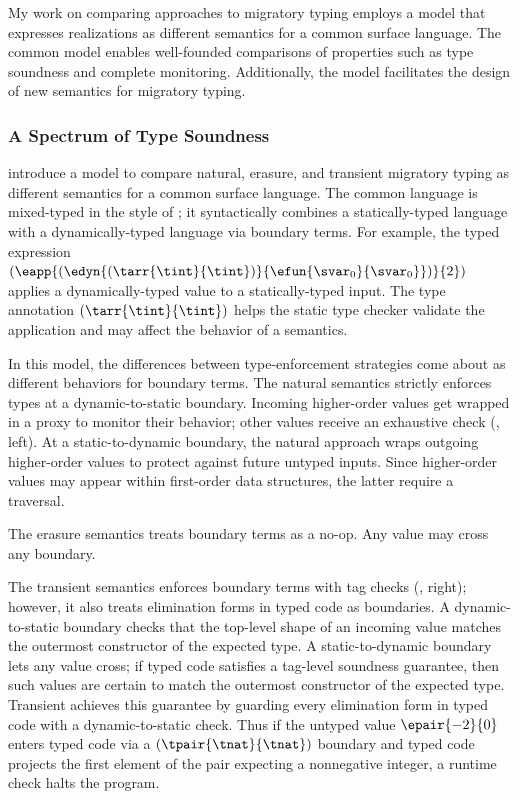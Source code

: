My work on comparing approaches to migratory typing employs
 a model that expresses realizations as different semantics
 for a common surface language.
The common model enables well-founded comparisons of properties
 such as type soundness and complete monitoring.
Additionally, the model facilitates the design of new semantics for migratory
 typing.


\subsubsection{A Spectrum of Type Soundness}


\citet{gf-icfp-2018} introduce a model to compare natural, erasure, and
 transient migratory typing as different semantics for a common surface
 language.
The common language is mixed-typed in the style of \citet{mf-toplas-2009};
 it syntactically combines a statically-typed language with a dynamically-typed
 language via boundary terms.
For example, the typed expression
 $(\eapp{(\edyn{(\tarr{\tint}{\tint})}{\efun{\svar_0}{\svar_0}})}{2})$
 applies a dynamically-typed value to a statically-typed input.
The type annotation $(\tarr{\tint}{\tint})$ helps the static type checker
 validate the application and may affect the behavior of a semantics.

In this model, the differences between type-enforcement strategies
 come about as different behaviors for boundary terms.
The natural semantics strictly enforces types at a dynamic-to-static
 boundary.
Incoming higher-order values get wrapped in a proxy to monitor their
 behavior; other values receive an exhaustive check (, left).
At a static-to-dynamic boundary, the natural approach wraps outgoing
 higher-order values to protect against future untyped inputs.
Since higher-order values may appear within first-order data structures,
 the latter require a traversal.

The erasure semantics treats boundary terms as a no-op.
Any value may cross any boundary.

The transient semantics enforces boundary terms with tag checks (, right);
 however, it also treats elimination forms in typed code as boundaries.
A dynamic-to-static boundary checks that the top-level shape of an incoming
 value matches the outermost constructor of the expected type.
A static-to-dynamic boundary lets any value cross; if typed code satisfies a
 tag-level soundness guarantee, then such values are certain to match the
 outermost constructor of the expected type.
Transient achieves this guarantee by guarding every elimination form in typed
 code with a dynamic-to-static check.
Thus if the untyped value $\epair{{-2}}{{0}}$ enters typed code via a
 $(\tpair{\tnat}{\tnat})$ boundary and typed code projects the first element
 of the pair expecting a nonnegative integer, a runtime check halts the program.

